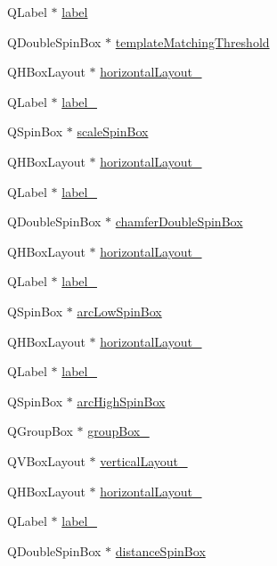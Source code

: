 \begin{DoxyCompactItemize}
\item 
QLabel $\ast$ \hyperlink{classUi__Gui_a4c5f4c354553588e40853bfc414ce89d}{label}
\item 
QDoubleSpinBox $\ast$ \hyperlink{classUi__Gui_a392eecf3d4394e8429553c262c0efea0}{templateMatchingThreshold}
\item 
QHBoxLayout $\ast$ \hyperlink{classUi__Gui_a72fc39f7a2e24c91cacb11b2dddbde5e}{horizontalLayout\_}
\item 
QLabel $\ast$ \hyperlink{classUi__Gui_a3a371e9c7fc230f4ddcf3d2474f2c557}{label\_}
\item 
QSpinBox $\ast$ \hyperlink{classUi__Gui_a957da99b260b0e8c5821cac9920ecf22}{scaleSpinBox}
\item 
QHBoxLayout $\ast$ \hyperlink{classUi__Gui_ad4268c77f27ff8dff65526981d11432a}{horizontalLayout\_}
\item 
QLabel $\ast$ \hyperlink{classUi__Gui_ab80a95742f83006b4f5e02698e5c79fc}{label\_}
\item 
QDoubleSpinBox $\ast$ \hyperlink{classUi__Gui_acfed8700f62532a1047c5ba7b644612c}{chamferDoubleSpinBox}
\item 
QHBoxLayout $\ast$ \hyperlink{classUi__Gui_a1ed613358f44f0e6e7e9f7a982a2d539}{horizontalLayout\_}
\item 
QLabel $\ast$ \hyperlink{classUi__Gui_a7f6b419f79f16921762e9cc655c705fd}{label\_}
\item 
QSpinBox $\ast$ \hyperlink{classUi__Gui_a393c5c0093fc0f98911b5f6a9cdaa4d4}{arcLowSpinBox}
\item 
QHBoxLayout $\ast$ \hyperlink{classUi__Gui_aa9a593b9160a357d99e7b667daded3f3}{horizontalLayout\_}
\item 
QLabel $\ast$ \hyperlink{classUi__Gui_a80271e356a6832435c59eb79926d52f7}{label\_}
\item 
QSpinBox $\ast$ \hyperlink{classUi__Gui_ad77dd52c6b1aec3b511b2c7792b5e0c2}{arcHighSpinBox}
\item 
QGroupBox $\ast$ \hyperlink{classUi__Gui_ade73778e93283a2c04576ace8cc6d10a}{groupBox\_}
\item 
QVBoxLayout $\ast$ \hyperlink{classUi__Gui_a4ed8e4d187e4e7ea02dd1a874ab3555b}{verticalLayout\_}
\item 
QHBoxLayout $\ast$ \hyperlink{classUi__Gui_a991c75b9d4ad8b476ed8bfabab40a856}{horizontalLayout\_}
\item 
QLabel $\ast$ \hyperlink{classUi__Gui_a1a3f26ab3569c67948018c1e0de2cca5}{label\_}
\item 
QDoubleSpinBox $\ast$ \hyperlink{classUi__Gui_a99c57feafa92582a923104e8bd86f235}{distanceSpinBox}

\end{DoxyCompactItemize}
